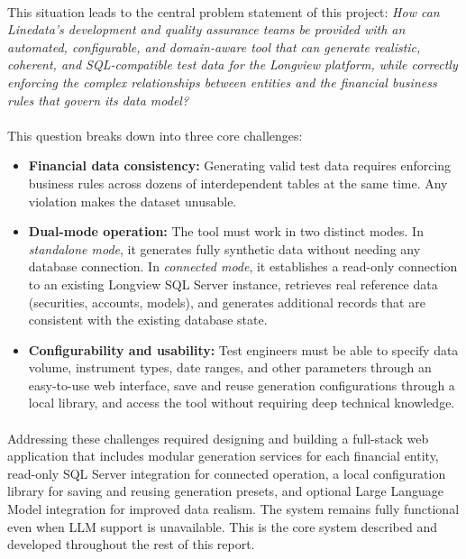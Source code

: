 \paragraph{}This situation leads to the central problem statement of this project: \textit{How can Linedata's development and quality assurance teams be provided with an automated, configurable, and domain-aware tool that can generate realistic, coherent, and SQL-compatible test data for the Longview platform, while correctly enforcing the complex relationships between entities and the financial business rules that govern its data model?}

\paragraph{}This question breaks down into three core challenges:

\begin{itemize}
\item \textbf{Financial data consistency:} Generating valid test data requires enforcing business rules across dozens of interdependent tables at the same time. Any violation makes the dataset unusable.

\item \textbf{Dual-mode operation:} The tool must work in two distinct modes. In \textit{standalone mode}, it generates fully synthetic data without needing any database connection. In \textit{connected mode}, it establishes a read-only connection to an existing Longview SQL Server instance, retrieves real reference data (securities, accounts, models), and generates additional records that are consistent with the existing database state.

\item \textbf{Configurability and usability:} Test engineers must be able to specify data volume, instrument types, date ranges, and other parameters through an easy-to-use web interface, save and reuse generation configurations through a local library, and access the tool without requiring deep technical knowledge.
\end{itemize}

\paragraph{}Addressing these challenges required designing and building a full-stack web application that includes modular generation services for each financial entity, read-only SQL Server integration for connected operation, a local configuration library for saving and reusing generation presets, and optional Large Language Model integration for improved data realism. The system remains fully functional even when LLM support is unavailable. This is the core system described and developed throughout the rest of this report.

